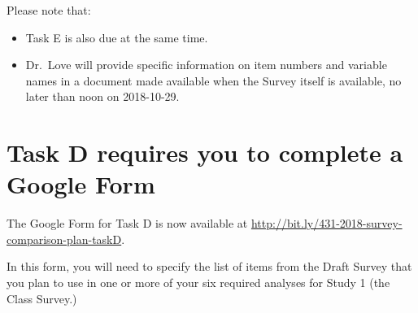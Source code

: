 \documentclass[]{book}
\providecommand{\tightlist}{%
  \setlength{\itemsep}{0pt}\setlength{\parskip}{0pt}}
\theoremstyle{definition}
\theoremstyle{definition}
\theoremstyle{definition}
\theoremstyle{remark}
\begin{document}
Please note that:

\begin{itemize}
\tightlist
\item
  Task E is also due at the same time.
\item
  Dr.~Love will provide specific information on item numbers and
  variable names in a document made available when the Survey itself is
  available, no later than noon on 2018-10-29.
\end{itemize}

\hypertarget{task-d-requires-you-to-complete-a-google-form}{%
\section{Task D requires you to complete a Google
Form}\label{task-d-requires-you-to-complete-a-google-form}}

The Google Form for Task D is now available at
\url{http://bit.ly/431-2018-survey-comparison-plan-taskD}.

In this form, you will need to specify the list of items from the Draft
Survey that you plan to use in one or more of your six required analyses
for Study 1 (the Class Survey.)
\end{document}
